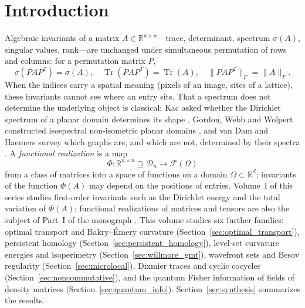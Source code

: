 \documentclass[11pt,a4paper,reqno]{amsart}
\theoremstyle{definition}
\numberwithin{equation}{section}
\newcommand{\R}{\mathbb{R}}
\newcommand{\Tr}{\operatorname{Tr}}
\begin{document}
\maketitle

\tableofcontents

\newpage

\section{Introduction}
\label{sec:intro}

Algebraic invariants of a matrix $A \in \R^{n \times n}$---trace, determinant, spectrum $\sigma(A)$, singular values, rank---are unchanged under simultaneous permutation of rows and columns: for a permutation matrix $P$,
\begin{equation}
    \sigma(PAP^T) = \sigma(A), \quad \Tr(PAP^T) = \Tr(A), \quad \|PAP^T\|_F = \|A\|_F.
\end{equation}
When the indices carry a spatial meaning (pixels of an image, sites of a lattice), these invariants cannot see where an entry sits. That a spectrum does not determine the underlying object is classical: Kac asked whether the Dirichlet spectrum of a planar domain determines its shape \cite{kac1966can}, Gordon, Webb and Wolpert constructed isospectral non-isometric planar domains \cite{gordon1992one}, and van Dam and Haemers survey which graphs are, and which are not, determined by their spectra \cite{vandam2003which}. A \emph{functional realization} is a map
\begin{equation}
    \Phi \colon \R^{n \times n} \supseteq \mathcal{D}_n \longrightarrow \mathcal{F}(\Omega)
\end{equation}
from a class of matrices into a space of functions on a domain $\Omega \subset \R^d$; invariants of the function $\Phi(A)$ may depend on the positions of entries. Volume~I \cite{silvafilho2026beyond} of this series studies first-order invariants such as the Dirichlet energy and the total variation of $\Phi(A)$; functional realizations of matrices and tensors are also the subject of Part~I of the monograph \cite{silvafilho2026geometry}. This volume studies six further families: optimal transport and Bakry--\'Emery curvature (Section~\ref{sec:optimal_transport}), persistent homology (Section~\ref{sec:persistent_homology}), level-set curvature energies and isoperimetry (Section~\ref{sec:willmore_gmt}), wavefront sets and Besov regularity (Section~\ref{sec:microlocal}), Dixmier traces and cyclic cocycles (Section~\ref{sec:noncommutative}), and the quantum Fisher information of fields of density matrices (Section~\ref{sec:quantum_info}). Section~\ref{sec:synthesis} summarizes the results.
\end{document}
